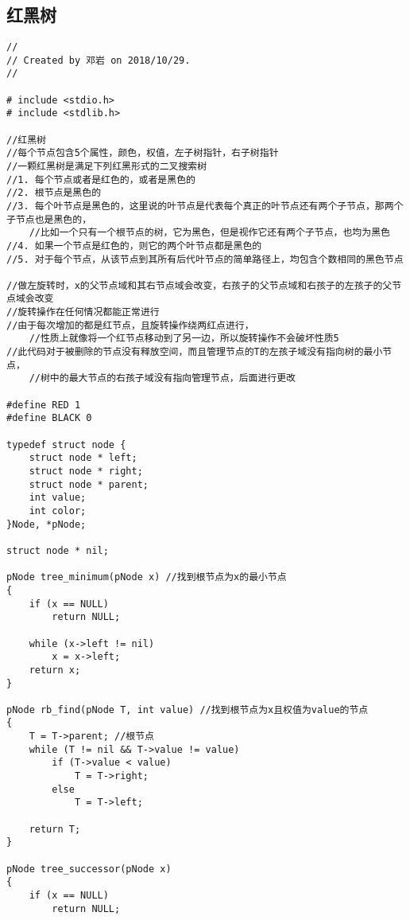 \section{\color[rgb]{0.2,0.4,0.6}{树}}
\subsection{红黑树}
\begin{verbatim}
//
// Created by 邓岩 on 2018/10/29.
//

# include <stdio.h>
# include <stdlib.h>

//红黑树
//每个节点包含5个属性，颜色，权值，左子树指针，右子树指针
//一颗红黑树是满足下列红黑形式的二叉搜索树
//1. 每个节点或者是红色的，或者是黑色的
//2. 根节点是黑色的
//3. 每个叶节点是黑色的，这里说的叶节点是代表每个真正的叶节点还有两个子节点，那两个子节点也是黑色的，
    //比如一个只有一个根节点的树，它为黑色，但是视作它还有两个子节点，也均为黑色
//4. 如果一个节点是红色的，则它的两个叶节点都是黑色的
//5. 对于每个节点，从该节点到其所有后代叶节点的简单路径上，均包含个数相同的黑色节点

//做左旋转时，x的父节点域和其右节点域会改变，右孩子的父节点域和右孩子的左孩子的父节点域会改变
//旋转操作在任何情况都能正常进行
//由于每次增加的都是红节点，且旋转操作绕两红点进行，
    //性质上就像将一个红节点移动到了另一边，所以旋转操作不会破坏性质5
//此代码对于被删除的节点没有释放空间，而且管理节点的T的左孩子域没有指向树的最小节点，
    //树中的最大节点的右孩子域没有指向管理节点，后面进行更改

#define RED 1
#define BLACK 0

typedef struct node {
    struct node * left;
    struct node * right;
    struct node * parent;
    int value;
    int color;
}Node, *pNode;

struct node * nil;

pNode tree_minimum(pNode x) //找到根节点为x的最小节点
{
    if (x == NULL)
        return NULL;

    while (x->left != nil)
        x = x->left;
    return x;
}

pNode rb_find(pNode T, int value) //找到根节点为x且权值为value的节点
{
    T = T->parent; //根节点
    while (T != nil && T->value != value)
        if (T->value < value)
            T = T->right;
        else
            T = T->left;

    return T;
}

pNode tree_successor(pNode x)
{
    if (x == NULL)
        return NULL;


\end{verbatim}
